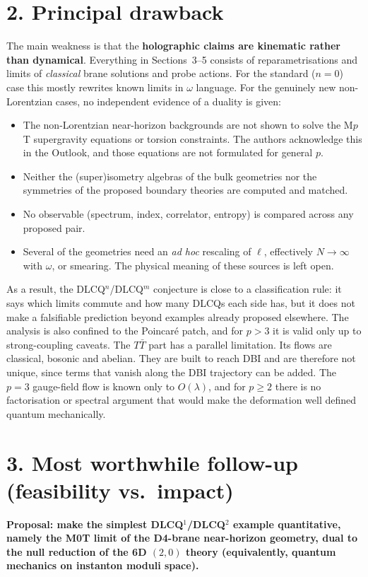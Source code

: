 \documentclass[11pt,a4paper]{article}
\newcommand{\TTbar}{$T\bar{T}$}
\begin{document}
\section*{2. Principal drawback}
The main weakness is that the \textbf{holographic claims are kinematic rather than dynamical}.
Everything in Sections~3--5 consists of reparametrisations and limits of
\emph{classical} brane solutions and probe actions. For the standard ($n=0$) case this
mostly rewrites known limits in $\omega$ language. For the genuinely new
non-Lorentzian cases, no independent evidence of a duality is given:
\begin{itemize}[nosep]
\item The non-Lorentzian near-horizon backgrounds are not shown to solve the M$p$T
  supergravity equations or torsion constraints. The authors acknowledge this in the
  Outlook, and those equations are not formulated for general $p$.
\item Neither the (super)isometry algebras of the bulk geometries nor the symmetries
  of the proposed boundary theories are computed and matched.
\item No observable (spectrum, index, correlator, entropy) is compared across any proposed pair.
\item Several of the geometries need an \emph{ad hoc} rescaling of $\ell$, effectively
  $N\to\infty$ with $\omega$, or smearing. The physical meaning of these sources is left open.
\end{itemize}
As a result, the DLCQ$^n$/DLCQ$^m$ conjecture is close to a classification
rule: it says which limits commute and how many DLCQs each side has, but it does not
make a falsifiable prediction beyond examples already proposed elsewhere. The analysis
is also confined to the Poincar\'e patch, and for $p>3$ it is valid only up to strong-coupling caveats. The
\TTbar{} part has a parallel limitation. Its flows are classical, bosonic and abelian.
They are built to reach DBI and are therefore not unique, since terms that vanish
along the DBI trajectory can be added. The $p=3$ gauge-field flow is known only to
$O(\lambda)$, and for $p\ge2$ there is no factorisation or spectral argument
that would make the deformation well defined quantum mechanically.

\section*{3. Most worthwhile follow-up (feasibility vs.\ impact)}
\textbf{Proposal: make the simplest DLCQ$^1$/DLCQ$^2$ example quantitative, namely the
M0T limit of the D4-brane near-horizon geometry, dual to the null reduction of the 6D $(2,0)$
theory (equivalently, quantum mechanics on instanton moduli space).}
\end{document}
